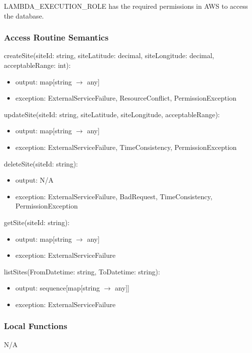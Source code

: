 \documentclass[12pt, titlepage]{article}
\begin{document}
LAMBDA\_EXECUTION\_ROLE has the required permissions in AWS to access
the database.

\subsubsection{Access Routine Semantics}
\noindent createSite(siteId: string, siteLatitude: decimal, siteLongitude:
decimal, acceptableRange: int):
\begin{itemize}
  \item output: map[string $\rightarrow$ any]
  \item exception: ExternalServiceFailure, ResourceConflict, PermissionException
\end{itemize}

\noindent updateSite(siteId: string, siteLatitude, siteLongitude,
acceptableRange):
\begin{itemize}
  \item output: map[string $\rightarrow$ any]
  \item exception: ExternalServiceFailure, TimeConsistency, PermissionException
\end{itemize}

\noindent deleteSite(siteId: string):
\begin{itemize}
  \item output: N/A
  \item exception: ExternalServiceFailure, BadRequest, TimeConsistency,
    PermissionException
\end{itemize}

\noindent getSite(siteId: string):
\begin{itemize}
  \item output: map[string $\rightarrow$ any]
  \item exception: ExternalServiceFailure
\end{itemize}

\noindent listSites(FromDatetime: string, ToDatetime: string):
\begin{itemize}
  \item output: sequence[map[string $\rightarrow$ any]]
  \item exception: ExternalServiceFailure
\end{itemize}

\subsubsection{Local Functions}

N/A
\end{document}
